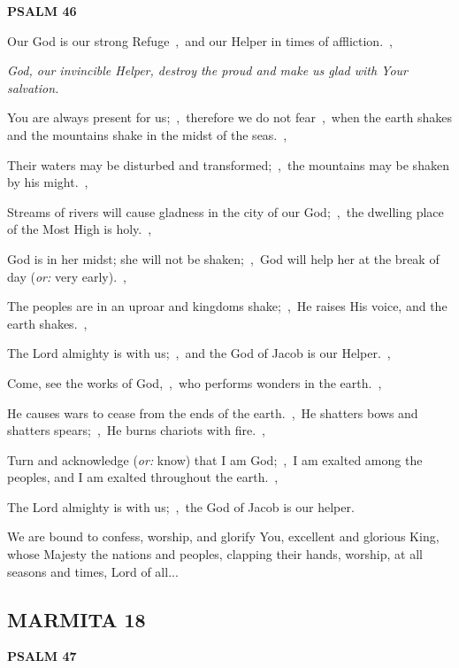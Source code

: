 \documentclass[12pt,twoside,a5paper]{article}
\newcommand{\marmita}[1]{\subsection*{MARMITA {#1}}}
\newcommand{\psalm}[1]{\textbf{PSALM {#1}}\nopagebreak}
\newcommand{\qanona}[1]{{\liturgicalhint{Qanona.} \emph{#1}}}
\newcommand{\slota}[1]{\liturgicalhint{Slota.} #1}
\newcommand{\translationoption}[1]{\emph{or:} #1}
\begin{document}
\psalm{46}

\begin{normalparskip}
  Our God is our strong Refuge~\sep\ and our Helper in times of affliction.~\sep

  \qanona{God, our invincible Helper, destroy the proud and make us glad with Your salvation.}

  You are always present for us;~\sep\ therefore we do not fear~\sep\ when the earth shakes and the mountains shake in the midst of the seas.~\sep

  Their waters may be disturbed and transformed;~\sep\ the mountains may be shaken by his might.~\sep

  Streams of rivers will cause gladness in the city of our God;~\sep\ the dwelling place of the Most High is holy.~\sep

  God is in her midst; she will not be shaken;~\sep\ God will help her at the break of day (\translationoption{very early}).~\sep

  The peoples are in an uproar and kingdoms shake;~\sep\ He raises His voice, and the earth shakes.~\sep

  The Lord almighty is with us;~\sep\ and the God of Jacob is our Helper.~\sep

  Come, see the works of God,~\sep\ who performs wonders in the earth.~\sep

  He causes wars to cease from the ends of the earth.~\sep\ He shatters bows and shatters spears;~\sep\ He burns chariots with fire.~\sep

  Turn and acknowledge (\translationoption{know}) that I am God;~\sep\ I am exalted among the peoples, and I am exalted throughout the earth.~\sep

  The Lord almighty is with us;~\sep\ the God of Jacob is our helper.
\end{normalparskip}

\slota{We are bound to confess, worship, and glorify You, excellent and glorious King, whose Majesty the nations and peoples, clapping their hands, worship, at all seasons and times, Lord of all...}

\marmita{18}

\psalm{47}
\end{document}

